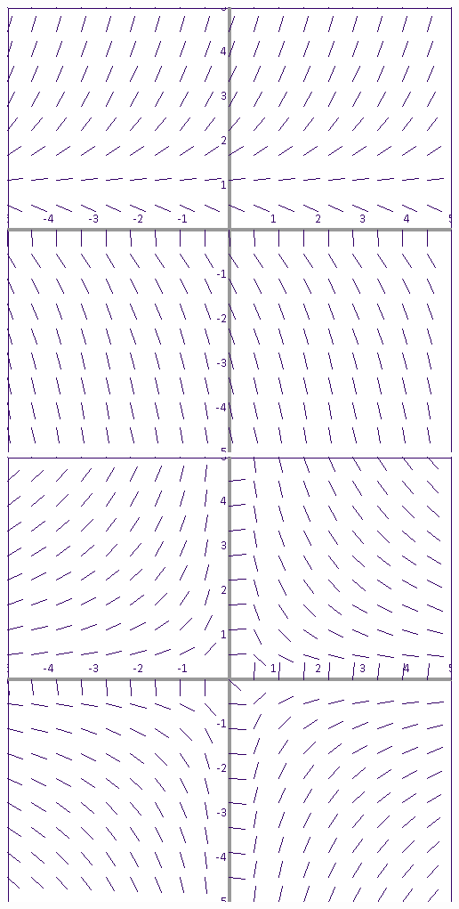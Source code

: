 \documentclass{article}
\begin{document}
\includegraphics[width=\textwidth]{5}\\
\includegraphics[width=\textwidth]{6}
	
\end{document}
